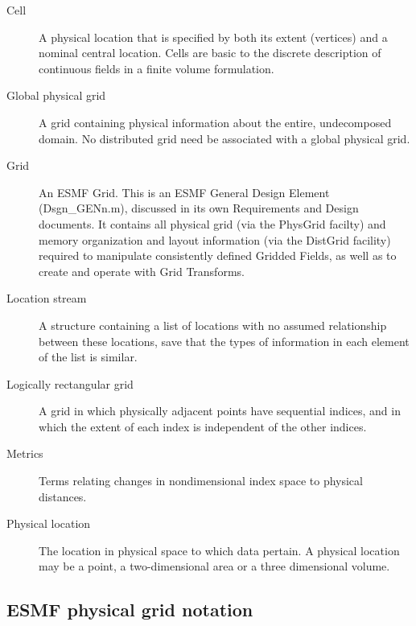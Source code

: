 
\begin{description}

\item [Cell] \label{glos:Cell} A physical location that is specified by both
its extent (vertices) and a nominal central location.  Cells are basic to the
discrete description of continuous fields in a finite volume formulation.

\item [Global physical grid] \label{glos:GlobGrid} A grid containing physical
information about the entire, undecomposed domain.  No distributed grid need be
associated with a global physical grid.

\item [Grid] An ESMF Grid. This is an ESMF General Design Element
(Dsgn\_GENn.m), discussed in its own Requirements and  Design documents. It
contains all physical grid (via the PhysGrid facilty) and memory organization
and layout information (via the DistGrid facility) required to manipulate
consistently defined Gridded Fields, as well as to create and operate with Grid
Transforms.

\item [Location stream] \label{glos:LocStream} A structure containing a list of
locations with no assumed relationship between these locations, save that the
types of information in each element of the list is similar.

\item [Logically rectangular grid] \label{glos:RecGrid} A grid in which
physically adjacent points have sequential indices, and in which the extent of
each index is independent of the other indices.

\item [Metrics] \label{glos:Metrics} Terms relating changes in nondimensional
index space to physical distances.

\item [Physical location] \label{glos:PhysLoc} The location in physical space 
to which data pertain.  A physical location may be a point, a two-dimensional 
area or a three dimensional volume.

\end{description}

\subsection{ESMF physical grid notation}

